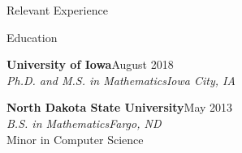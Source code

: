 \documentclass[hidelinks]{resume} %
\begin{document}
\begin{rSection}{Relevant Experience}




\end{rSection}


\begin{rSection}{Education}

{\bf University of Iowa}\hfill August 2018\\
{\em Ph.D. and M.S. in Mathematics}\hfill {\em Iowa City, IA}%

{\bf North Dakota State University}\hfill May 2013\\
{\em B.S. in Mathematics}\hfill {\em Fargo, ND}\\
Minor in Computer Science


\end{rSection}









\end{document}
